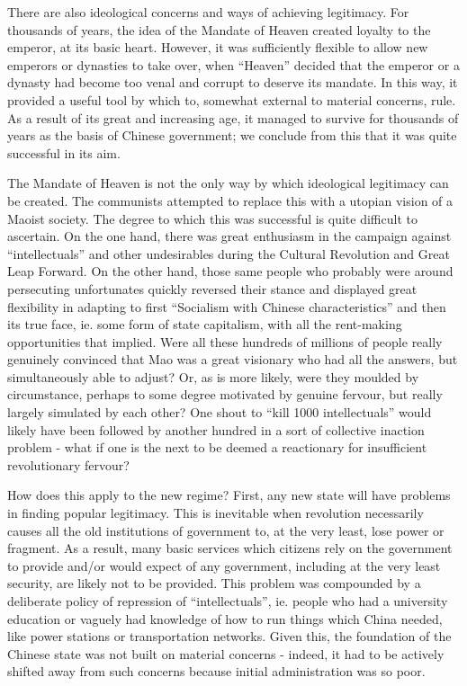 \documentclass[10pt,a4paper,twocolumn]{article}
\begin{document}
There are also ideological concerns and ways of achieving legitimacy. For thousands of years, the idea of the Mandate of Heaven created loyalty to the emperor, at its basic heart. However, it was sufficiently flexible to allow new emperors or dynasties to take over, when ``Heaven'' decided that the emperor or a dynasty had become too venal and corrupt to deserve its mandate. In this way, it provided a useful tool by which to, somewhat external to material concerns, rule. As a result of its great and increasing age, it managed to survive for thousands of years as the basis of Chinese government; we conclude from this that it was quite successful in its aim. 

The Mandate of Heaven is not the only way by which ideological legitimacy can be created. The communists attempted to replace this with a utopian vision of a Maoist society. The degree to which this was successful is quite difficult to ascertain. On the one hand, there was great enthusiasm in the campaign against ``intellectuals'' and other undesirables during the Cultural Revolution and Great Leap Forward. On the other hand, those same people who probably were around persecuting unfortunates quickly reversed their stance and displayed great flexibility in adapting to first ``Socialism with Chinese characteristics'' and then its true face, ie. some form of state capitalism, with all the rent-making opportunities that implied. Were all these hundreds of millions of people really genuinely convinced that Mao was a great visionary who had all the answers, but simultaneously able to adjust? Or, as is more likely, were they moulded by circumstance, perhaps to some degree motivated by genuine fervour, but really largely simulated by each other? One shout to ``kill 1000 intellectuals'' would likely have been followed by another hundred in a sort of collective inaction problem - what if one is the next to be deemed a reactionary for insufficient revolutionary fervour?

How does this apply to the new regime? First, any new state will have problems in finding popular legitimacy. This is inevitable when revolution necessarily causes all the old institutions of government to, at the very least, lose power or fragment. As a result, many basic services which citizens rely on the government to provide and/or would expect of any government, including at the very least security, are likely not to be provided. This problem was compounded by a deliberate policy of repression of ``intellectuals'', ie. people who had a university education or vaguely had knowledge of how to run things which China needed, like power stations or transportation networks. Given this, the foundation of the Chinese state was not built on material concerns - indeed, it had to be actively shifted away from such concerns because initial administration was so poor.
\end{document}
